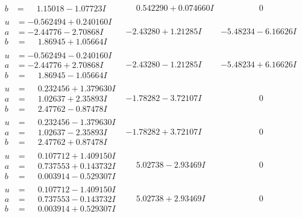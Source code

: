 \documentclass[1p]{elsarticle_modified}
\theoremstyle{definition}
\begin{document}
$$\begin{array}{c|c|c}
\begin{aligned}
b &= \phantom{-}1.15018 - 1.07723 I\end{aligned}
 & \phantom{-}0.542290 + 0.074660 I & \phantom{-0.000000 } 0 \\ \hline\begin{aligned}
u &= -0.562494 + 0.240160 I \\
a &= -2.44776 - 2.70868 I \\
b &= \phantom{-}1.86945 + 1.05664 I\end{aligned}
 & -2.43280 + 1.21285 I & -5.48234 - 6.16626 I \\ \hline\begin{aligned}
u &= -0.562494 - 0.240160 I \\
a &= -2.44776 + 2.70868 I \\
b &= \phantom{-}1.86945 - 1.05664 I\end{aligned}
 & -2.43280 - 1.21285 I & -5.48234 + 6.16626 I \\ \hline\begin{aligned}
u &= \phantom{-}0.232456 + 1.379630 I \\
a &= \phantom{-}1.02637 + 2.35893 I \\
b &= \phantom{-}2.47762 - 0.87478 I\end{aligned}
 & -1.78282 - 3.72107 I & \phantom{-0.000000 } 0 \\ \hline\begin{aligned}
u &= \phantom{-}0.232456 - 1.379630 I \\
a &= \phantom{-}1.02637 - 2.35893 I \\
b &= \phantom{-}2.47762 + 0.87478 I\end{aligned}
 & -1.78282 + 3.72107 I & \phantom{-0.000000 } 0 \\ \hline\begin{aligned}
u &= \phantom{-}0.107712 + 1.409150 I \\
a &= \phantom{-}0.737553 + 0.143732 I \\
b &= \phantom{-}0.003914 - 0.529307 I\end{aligned}
 & \phantom{-}5.02738 - 2.93469 I & \phantom{-0.000000 } 0 \\ \hline\begin{aligned}
u &= \phantom{-}0.107712 - 1.409150 I \\
a &= \phantom{-}0.737553 - 0.143732 I \\
b &= \phantom{-}0.003914 + 0.529307 I\end{aligned}
 & \phantom{-}5.02738 + 2.93469 I & \phantom{-0.000000 } 0 \\ \hline\begin{aligned}

\end{aligned}
\end{array}$$
\end{document}
